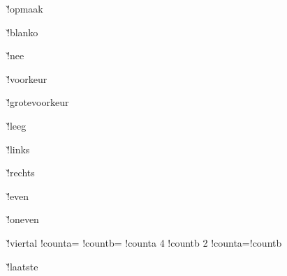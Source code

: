 \installpagehandler \v!opmaak
  {\ifpaginageblokkeerd\else
     \eject
   \fi}

\installpagehandler \v!blanko
  {\pagebodyornamentsfalse}

\installpagehandler \v!nee
  {\ifpaginageblokkeerd\else
     \dosomebreak\nobreak
   \fi}

\installpagehandler \v!voorkeur
  {\ifpaginageblokkeerd\else
     \ifbinnenkolommen
       \dosomebreak\goodbreak
     \else
       \testpagina[3][\!!zeropoint]%
     \fi
    \fi}

\installpagehandler \v!grotevoorkeur
  {\ifpaginageblokkeerd\else
     \ifbinnenkolommen
       \dosomebreak\goodbreak
     \else
       \testpagina[5][\!!zeropoint]%
     \fi
   \fi}

\installpagehandler \v!leeg
  {\ejectinsert
   \ejectpage
     {\setupheader[\c!status=\v!leeg]}%
     {\setupfooter[\c!status=\v!leeg]}%
   \ejectdummypage}

\installpagehandler \v!links
  {\ejectinsert
   \superejectpage
   \doifbothsidesoverruled
   \orsideone
     \resetcurrentsectionmarks
     \ejectdummypage
   \orsidetwo
   \od}

\installpagehandler \v!rechts
  {\ejectinsert
   \superejectpage
   \doifbothsidesoverruled
   \orsideone
   \orsidetwo
     \resetcurrentsectionmarks
     \ejectdummypage
   \od}

\installpagehandler \v!even
  {\pagina
   \doifonevenpaginaelse
     {\resetcurrentsectionmarks\ejectdummypage}{}}

\installpagehandler \v!oneven
  {\pagina
   \doifonevenpaginaelse
     {}{\resetcurrentsectionmarks\ejectdummypage}}

\installpagehandler \v!viertal
  {\ifdubbelzijdig
     \!!counta=\realpageno
     \!!countb=\realpageno
     \divide\!!counta 4
     \divide\!!countb 2
     \ifnum\!!counta=\!!countb
     \else
       \pagina
       \pagina[\v!leeg]%
       \pagina[\v!leeg]%
     \fi
   \fi}

\installpagehandler \v!laatste
  {\ejectinsert
   \superejectpage\relax
   \doifbothsidesoverruled
     \naastpagina
   \orsideone
   \orsidetwo
       \noheaderandfooterlines
       \ejectdummypage
   \od
   \filluparrangedpages}


